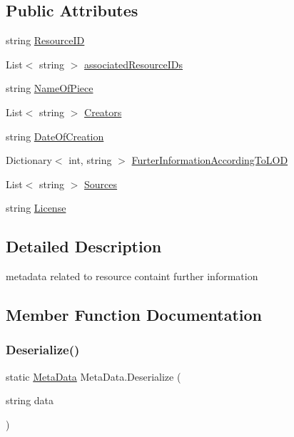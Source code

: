 \subsection*{Public Attributes}
\begin{DoxyCompactItemize}
\item 
string \mbox{\hyperlink{class_meta_data_a1bbd18efe27fdbeb0ee920414caa12c8}{Resource\+ID}}
\item 
List$<$ string $>$ \mbox{\hyperlink{class_meta_data_a1cdef15bd6753836cd2baa6533ebc306}{associated\+Resource\+I\+Ds}}
\item 
string \mbox{\hyperlink{class_meta_data_abb2ca2ab73300089a68d6c38f5610949}{Name\+Of\+Piece}}
\item 
List$<$ string $>$ \mbox{\hyperlink{class_meta_data_a498505a8b02fe2f7413092c42d81e8a7}{Creators}}
\item 
string \mbox{\hyperlink{class_meta_data_a693a56223c266f028740844681877e45}{Date\+Of\+Creation}}
\item 
Dictionary$<$ int, string $>$ \mbox{\hyperlink{class_meta_data_ab307dc4b5f061d3c8f610048176a6520}{Furter\+Information\+According\+To\+L\+OD}}
\item 
List$<$ string $>$ \mbox{\hyperlink{class_meta_data_acb76cf00c140a3da86a35ff350d0c05f}{Sources}}
\item 
string \mbox{\hyperlink{class_meta_data_a43c021341f7ac2b2237041aae37bd3db}{License}}
\end{DoxyCompactItemize}


\subsection{Detailed Description}
metadata related to resource containt further information 



\subsection{Member Function Documentation}
\mbox{\label{class_meta_data_adcfb4cc074566933e35c3f14451960ed}} 
\subsubsection{\texorpdfstring{Deserialize()}{Deserialize()}}
{\footnotesize\ttfamily static \mbox{\hyperlink{class_meta_data}{Meta\+Data}} Meta\+Data.\+Deserialize (\begin{DoxyParamCaption}\item[{string}]{data }\end{DoxyParamCaption})\hspace{0.3cm}{\ttfamily [static]}}

